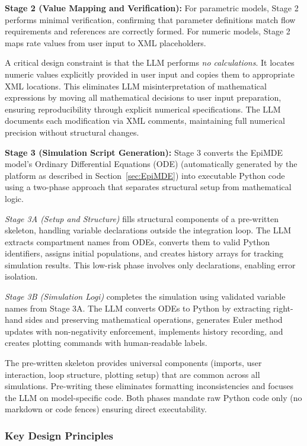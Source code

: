 \textbf{Stage 2 (Value Mapping and Verification):} For parametric models, Stage 2 performs minimal verification, confirming that parameter definitions match flow requirements and references are correctly formed. For numeric models, Stage 2 maps rate values from user input to XML placeholders.

A critical design constraint is that the LLM performs \textit{no calculations}. It locates numeric values explicitly provided in user input and copies them to appropriate XML locations. This eliminates LLM misinterpretation of mathematical expressions by moving all mathematical decisions to user input preparation, ensuring reproducibility through explicit numerical specifications. The LLM documents each modification via XML comments, maintaining full numerical precision without structural changes.

\textbf{Stage 3 (Simulation Script Generation):} Stage 3 converts the EpiMDE model's Ordinary Differential Equations (ODE) (automatically generated by the platform as described in Section~\ref{sec:EpiMDE}) into executable Python code using a two-phase approach that separates structural setup from mathematical logic.

\textit{Stage 3A (Setup and Structure)} fills structural components of a pre-written skeleton, handling variable declarations outside the integration loop. The LLM extracts compartment names from ODEs, converts them to valid Python identifiers, assigns initial populations, and creates history arrays for tracking simulation results. This low-risk phase involves only declarations, enabling error isolation.

\textit{Stage 3B (Simulation Logi)} completes the simulation using validated variable names from Stage 3A. The LLM converts ODEs to Python by extracting right-hand sides and preserving mathematical operations, generates Euler method updates with non-negativity enforcement, implements history recording, and creates plotting commands with human-readable labels.

The pre-written skeleton provides universal components (imports, user interaction, loop structure, plotting setup) that are common across all simulations. Pre-writing these eliminates formatting inconsistencies and focuses the LLM on model-specific code. Both phases mandate raw Python code only (no markdown or code fences) ensuring direct executability.

\subsubsection{Key Design Principles}

